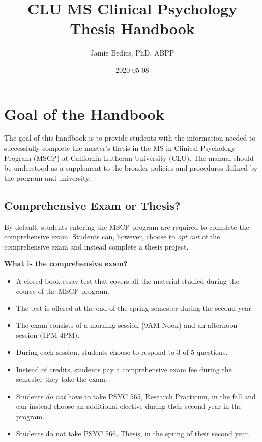 \documentclass[openany]{book}
\title{CLU MS Clinical Psychology Thesis Handbook}
\author{Jamie Bedics, PhD, ABPP}
\date{2020-05-08}
\providecommand{\tightlist}{%
  \setlength{\itemsep}{0pt}\setlength{\parskip}{0pt}}
\begin{document}
\maketitle

{
\setcounter{tocdepth}{1}
\tableofcontents
}
\hypertarget{goal-of-the-handbook}{%
\chapter{Goal of the Handbook}\label{goal-of-the-handbook}}

The goal of this handbook is to provide students with the information needed to successfully complete the master's thesis in the MS in Clinical Psychology Program (MSCP) at California Lutheran University (CLU). The manual should be understood as a supplement to the broader policies and procedures defined by the program and university.

\hypertarget{comprehensive-exam-or-thesis}{%
\section{Comprehensive Exam or Thesis?}\label{comprehensive-exam-or-thesis}}

By default, students entering the MSCP program are required to complete the comprehensive exam. Students can, however, choose to \emph{opt out} of the comprehensive exam and instead complete a thesis project.

\textbf{What is the comprehensive exam?}

\begin{itemize}
\tightlist
\item
  A closed book essay test that covers all the material studied during the course
  of the MSCP program.\\
\item
  The test is offered at the end of the spring semester during the second year.
\item
  The exam consists of a morning session (9AM-Noon) and an afternoon session (1PM-4PM).
\item
  During each session, students choose to respond to 3 of 5 questions.
\item
  Instead of credits, students pay a comprehensive exam fee during the semester they
  take the exam.
\item
  Students \emph{do not} have to take PSYC 565, Research Practicum, in the fall and can instead choose an
  additional elective during their second year in the program.
\item
  Students do not take PSYC 566, Thesis, in the spring of their second year.
\end{itemize}
\end{document}
